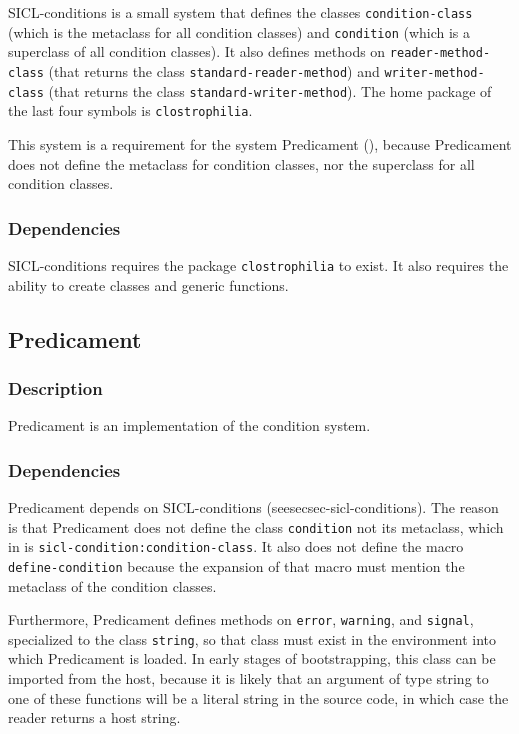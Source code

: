 SICL-conditions is a small system that defines the classes
\texttt{condition-class} (which is the metaclass for all condition
classes) and \texttt{condition} (which is a superclass of all
condition classes).  It also defines methods on
\texttt{reader-method-class} (that returns the class
\texttt{standard-reader-method}) and \texttt{writer-method-class}
(that returns the class \texttt{standard-writer-method}).  The home
package of the last four symbols is \texttt{clostrophilia}.

This system is a requirement for the system Predicament
(), because Predicament does not define the
metaclass for condition classes, nor the superclass for all condition
classes.

\subsubsection{Dependencies}

SICL-conditions requires the package \texttt{clostrophilia} to
exist. It also requires the ability to create classes and generic
functions.

\subsection{Predicament}
\label{sec-predicament}

\subsubsection{Description}

Predicament is an implementation of the \commonlisp{} condition system.

\subsubsection{Dependencies}

Predicament depends on SICL-conditions (seesec{sec-sicl-conditions}).
The reason is that Predicament does not define the class
\texttt{condition} not its metaclass, which in \sysname{} is
\texttt{sicl-condition:condition-class}.  It also does not define the
macro \texttt{define-condition} because the expansion of that macro
must mention the metaclass of the condition classes.

Furthermore, Predicament defines methods on \texttt{error},
\texttt{warning}, and \texttt{signal}, specialized to the class
\texttt{string}, so that class must exist in the environment into
which Predicament is loaded.  In early stages of bootstrapping, this
class can be imported from the host, because it is likely that an
argument of type string to one of these functions will be a literal
string in the source code, in which case the reader returns a host
string.

